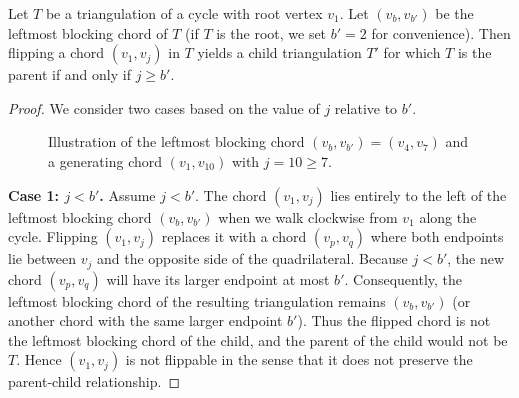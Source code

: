 \begin{lemma}
    \label{lem:flippability_condition}
    Let \(T\) be a triangulation of a cycle with root vertex \(v_1\). 
    Let \((v_b, v_{b'})\) be the leftmost blocking chord of \(T\) (if \(T\) is the root, we set \(b' = 2\) for convenience). 
    Then flipping a chord \((v_1, v_j)\) in \(T\) yields a child triangulation \(T'\) for which \(T\) is the parent if and only if \(j \ge b'\).
\end{lemma}

\begin{proof}
    We consider two cases based on the value of \(j\) relative to \(b'\).

    \begin{figure}[htbp]
        \centering
        \caption{Illustration of the leftmost blocking chord \((v_b, v_{b'}) = (v_4, v_7)\) and a generating chord \((v_1, v_{10})\) with \(j = 10 \ge 7\).}
        \label{fig:flippability}
    \end{figure}

    \noindent\textbf{Case 1: \(j < b'\).} 
    Assume \(j < b'\). 
    The chord \((v_1, v_j)\) lies entirely to the left of the leftmost blocking chord \((v_b, v_{b'})\) when we walk clockwise from \(v_1\) along the cycle. 
    Flipping \((v_1, v_j)\) replaces it with a chord \((v_p, v_q)\) where both endpoints lie between \(v_j\) and the opposite side of the quadrilateral. 
    Because \(j < b'\), the new chord \((v_p, v_q)\) will have its larger endpoint at most \(b'\). 
    Consequently, the leftmost blocking chord of the resulting triangulation remains \((v_b, v_{b'})\) (or another chord with the same larger endpoint \(b'\)). 
    Thus the flipped chord is not the leftmost blocking chord of the child, and the parent of the child would not be \(T\). 
    Hence \((v_1, v_j)\) is not flippable in the sense that it does not preserve the parent‑child relationship.


\end{proof}
